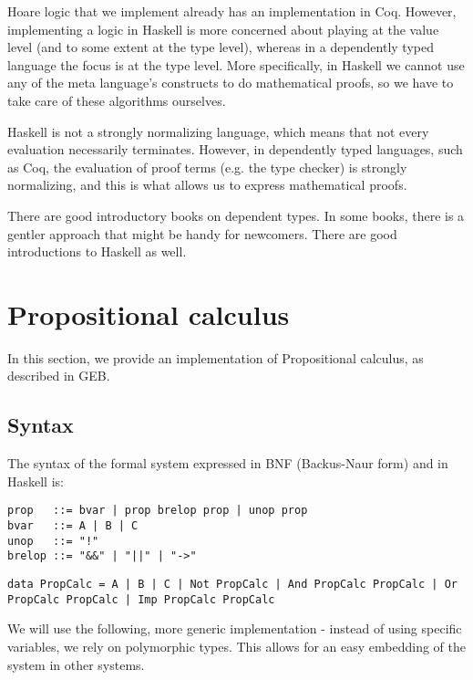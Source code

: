 \documentclass{article}
\begin{document}
Hoare logic that we implement already has an implementation in Coq\cite{b3}. However, implementing a logic in Haskell is more concerned about playing at the value level (and to some extent at the type level), whereas in a dependently typed language the focus is at the type level. More specifically, in Haskell we cannot use any of the meta language's constructs to do mathematical proofs, so we have to take care of these algorithms ourselves.

Haskell is not a strongly normalizing language, which means that not every evaluation necessarily terminates. However, in dependently typed languages, such as Coq\cite{b4}, the evaluation of proof terms (e.g. the type checker) is strongly normalizing, and this is what allows us to express mathematical proofs.

There are good introductory books on dependent types\cite{b3}. In some books, there is a gentler approach that might be handy for newcomers\cite{b5}. There are good introductions to Haskell as well\cite{b6}.

\section{Propositional calculus}

In this section, we provide an implementation of Propositional calculus, as described in GEB\cite{b7}.

\subsection{Syntax}

The syntax of the formal system expressed in BNF (Backus-Naur form) and in Haskell is:

\begin{minipage}{0.49\textwidth}
\begin{lstlisting}
prop   ::= bvar | prop brelop prop | unop prop
bvar   ::= A | B | C
unop   ::= "!"
brelop ::= "&&" | "||" | "->"
\end{lstlisting}
\end{minipage}
\begin{minipage}{0.49\textwidth}
\begin{lstlisting}
data PropCalc = A | B | C | Not PropCalc | And PropCalc PropCalc | Or PropCalc PropCalc | Imp PropCalc PropCalc
\end{lstlisting}
\end{minipage}

We will use the following, more generic implementation - instead of using specific variables, we rely on polymorphic types. This allows for an easy embedding of the system in other systems.
\end{document}
